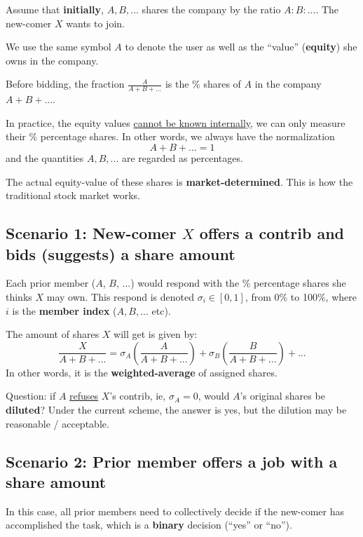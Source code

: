\documentclass[12pt, orivec, fleqn]{article}
\begin{document}
Assume that \textbf{initially}, $A, B, ...$ shares the company by the ratio $A : B : ...$.  The new-comer $X$ wants to join.

We use the same symbol $A$ to denote the user as well as the ``value'' (\textbf{equity}) she owns in the company.  

Before bidding, the fraction $\frac{A}{A + B + ...}$ is the \% shares of $A$ in the company $A + B + ...$.

In practice, the equity values \uline{cannot be known internally}, we can only measure their \% percentage shares.  In other words, we always have the normalization
\begin{equation}
A + B + ... = 1
\end{equation}
and the quantities $A, B, ...$ are regarded as percentages.

The actual equity-value of these shares is \textbf{market-determined}.  This is how the traditional stock market works.

\secttoc
\subsection{Scenario 1:  New-comer $X$ offers a contrib and bids (suggests) a share amount}

Each prior member ($A$, $B$, ...) would respond with the \% percentage shares she thinks $X$ may own.  This respond is denoted $\sigma_i \in [0,1]$, from 0\% to 100\%, where $i$ is the \textbf{member index} ($A, B, ... $ etc).

The amount of shares $X$ will get is given by:
\begin{equation}
\label{shares-assigned-to-X}
\frac{X}{A + B + ...} = \sigma_A (\frac{A}{A + B + ...}) + \sigma_B (\frac{B}{A + B + ...}) + ...
\end{equation}
In other words, it is the \textbf{weighted-average} of assigned shares.

Question:  if $A$ \uline{refuses} $X$'s contrib, ie, $\sigma_A = 0$, would $A$'s original shares be \textbf{diluted}?  Under the current scheme, the answer is yes, but the dilution may be reasonable / acceptable.

\secttoc
\subsection{Scenario 2:  Prior member offers a job with a share amount}

In this case, all prior members need to collectively decide if the new-comer has accomplished the task, which is a \textbf{binary} decision (``yes'' or ``no'').
\end{document}
